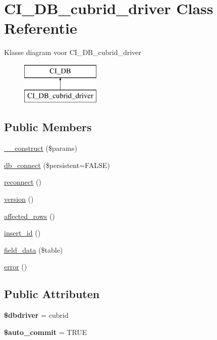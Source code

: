 \hypertarget{class_c_i___d_b__cubrid__driver}{}\section{C\+I\+\_\+\+D\+B\+\_\+cubrid\+\_\+driver Class Referentie}
\label{class_c_i___d_b__cubrid__driver}
Klasse diagram voor C\+I\+\_\+\+D\+B\+\_\+cubrid\+\_\+driver\begin{figure}[H]
\begin{center}
\leavevmode
\includegraphics[height=2.000000cm]{class_c_i___d_b__cubrid__driver}
\end{center}
\end{figure}
\subsection*{Public Members}
\begin{DoxyCompactItemize}
\item 
\mbox{\hyperlink{class_c_i___d_b__cubrid__driver_a9162320adff1a1a4afd7f2372f753a3e}{\+\_\+\+\_\+construct}} (\$params)
\item 
\mbox{\hyperlink{class_c_i___d_b__cubrid__driver_a52bf595e79e96cc0a7c907a9b45aeb4d}{db\+\_\+connect}} (\$persistent=F\+A\+L\+SE)
\item 
\mbox{\hyperlink{class_c_i___d_b__cubrid__driver_a57c19c642ab3023e28d10c50f86ff0a8}{reconnect}} ()
\item 
\mbox{\hyperlink{class_c_i___d_b__cubrid__driver_a6080dae0886626b9a4cedb29240708b1}{version}} ()
\item 
\mbox{\hyperlink{class_c_i___d_b__cubrid__driver_a77248aaad33eb132c04cc4aa3f4bc8cb}{affected\+\_\+rows}} ()
\item 
\mbox{\hyperlink{class_c_i___d_b__cubrid__driver_a933f2cde8dc7f87875e257d0a4902e99}{insert\+\_\+id}} ()
\item 
\mbox{\hyperlink{class_c_i___d_b__cubrid__driver_a90355121e1ed009e0efdbd544ab56efa}{field\+\_\+data}} (\$table)
\item 
\mbox{\hyperlink{class_c_i___d_b__cubrid__driver_a43b8d30b879d4f09ceb059b02af2bc02}{error}} ()
\end{DoxyCompactItemize}
\subsection*{Public Attributen}
\begin{DoxyCompactItemize}
\item 
\mbox{\label{class_c_i___d_b__cubrid__driver_a0cde2a16322a023d040aa7f725877597}} 
{\bfseries \$dbdriver} = \textquotesingle{}cubrid\textquotesingle{}
\item 
\mbox{\label{class_c_i___d_b__cubrid__driver_a2620b91fdfd73aa770c443ad172f1914}} 
{\bfseries \$auto\+\_\+commit} = T\+R\+UE
\end{DoxyCompactItemize}

